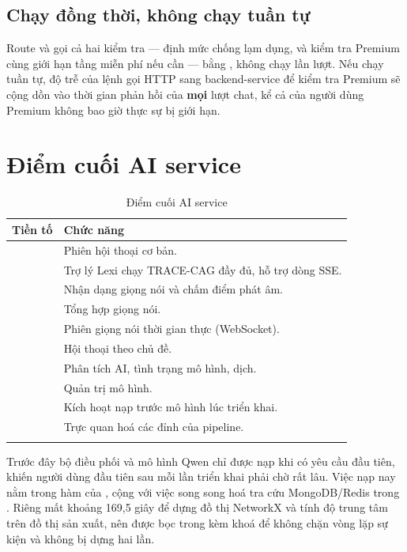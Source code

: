 \subsection{Chạy đồng thời, không chạy tuần tự}

Route  và  gọi cả hai kiểm tra — định mức chống lạm
dụng, và kiểm tra Premium cùng giới hạn tầng miễn phí nếu cần — bằng
, không chạy lần lượt. Nếu chạy tuần tự, độ trễ của lệnh gọi HTTP
sang backend-service để kiểm tra Premium sẽ cộng dồn vào thời gian phản hồi của
\textbf{mọi} lượt chat, kể cả của người dùng Premium không bao giờ thực sự bị giới hạn.

\section{Điểm cuối AI service}

\begin{longtable}{L{4.6cm} L{9.0cm}}
\toprule
\textbf{Tiền tố} & \textbf{Chức năng}\\
\midrule
\endhead
{} & Phiên hội thoại cơ bản.\\
 & Trợ lý Lexi chạy TRACE-CAG đầy đủ, hỗ trợ dòng SSE.\\
 & Nhận dạng giọng nói và chấm điểm phát âm.\\
 & Tổng hợp giọng nói.\\
 & Phiên giọng nói thời gian thực (WebSocket).\\
 & Hội thoại theo chủ đề.\\
 & Phân tích AI, tình trạng mô hình, dịch.\\
 & Quản trị mô hình.\\
 & Kích hoạt nạp trước mô hình lúc triển khai.\\
 & Trực quan hoá các đỉnh của pipeline.\\
\bottomrule
\caption{Điểm cuối AI service}
\end{longtable}

\begin{luuy}
Trước đây bộ điều phối và mô hình Qwen chỉ được nạp khi có yêu cầu đầu tiên, khiến người
dùng đầu tiên sau mỗi lần triển khai phải chờ rất lâu. Việc nạp nay nằm trong hàm
 của , cộng với việc song song hoá tra cứu MongoDB/Redis
trong . Riêng  mất khoảng 169,5 giây để dựng đồ thị
NetworkX và tính độ trung tâm trên đồ thị sản xuất, nên được bọc trong
 kèm khoá để không chặn vòng lặp sự kiện và không bị dựng hai lần.
\end{luuy}
